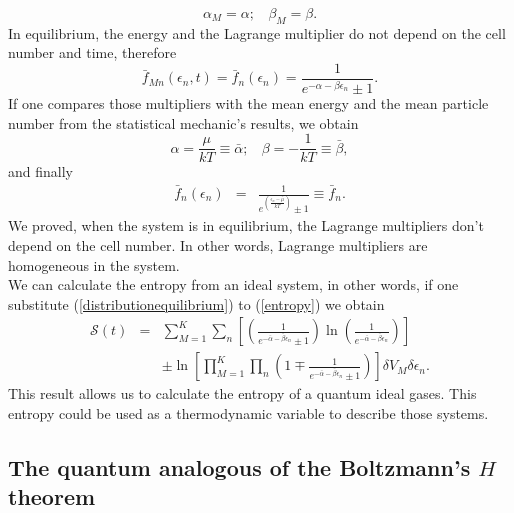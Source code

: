 \documentclass{article}
\newcommand{\de}{\delta}
\newcommand{\Ss}{\mathcal{S}}
\begin{document}
\begin{equation}
    \alpha_M=\alpha; \ \ \ \ \beta_M=\beta.
\end{equation}
In equilibrium, the energy and the Lagrange multiplier do not depend on the cell number and time, therefore
\begin{equation}
    \bar f_{Mn}(\epsilon_{n},t)=\bar f_n(\epsilon_{n}) =\frac{1}{e^{-\alpha-\beta \epsilon_n}\pm 1}.
\end{equation}{}
If one compares those multipliers with the mean energy and the mean particle number from the statistical mechanic's results, we obtain
\begin{equation}
    \alpha=\frac{\mu}{kT}\equiv \bar{\alpha}; \ \ \ \ \beta=-\frac{1}{kT}\equiv \bar{\beta},
\end{equation}{}
and finally
\begin{eqnarray}
    \bar{f}_{n}(\epsilon_{n})&=&\frac{1}{e^{(\frac{{\epsilon_n}-\bar{\mu}}{kT})}\pm 1}\equiv \bar{f}_{n}.
\end{eqnarray}{}
We proved, when the system is in equilibrium, the Lagrange multipliers don't depend on the cell number. In other words, Lagrange multipliers are homogeneous in the system.\\
We can calculate the entropy from an ideal system, in other words, if one substitute (\ref{distributionequilibrium}) to (\ref{entropy}) we obtain
\begin{eqnarray}
      \Ss(t)&=&\sum_{M=1}^{K} \sum_n  \left[\left(\frac{1}{e^{-\bar{\alpha}-\bar{\beta}\epsilon_{n}}\pm 1} \right)\ln \left(\frac{1}{e^{-\bar{\alpha}-\bar{\beta}\epsilon_{n}}} \right) \right]\nonumber \\
      &&\pm  \ln \left[\prod_{M=1}^{K} \prod_{n}\left(1 \mp \frac{1}{e^{-\bar{\alpha}-\bar{\beta}\epsilon_{n}}\pm 1} \right) \right] \de V_M \delta \epsilon_n\label{H-entropy}.
  \end{eqnarray}
  This result allows us to calculate the entropy of a quantum ideal gases. This entropy could be used as a thermodynamic variable to describe those systems.\\
  
\subsection{The quantum analogous of the Boltzmann's $H$ theorem}
\end{document}
